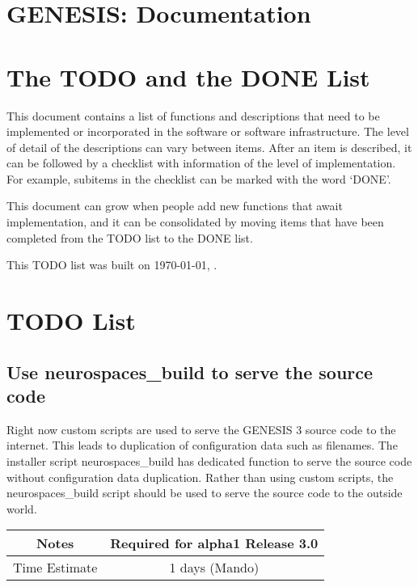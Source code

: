 \documentclass[12pt]{article}
\begin{document}
\section*{GENESIS: Documentation}

\section{The TODO and the DONE List}

This document contains a list of functions and descriptions that need
to be implemented or incorporated in the software or software
infrastructure.  The level of detail of the descriptions can vary
between items.  After an item is described, it can be followed by a
checklist with information of the level of implementation.  For
example, subitems in the checklist can be marked with the word `DONE'.

This document can grow when people add new functions that await
implementation, and it can be consolidated by moving items that have
been completed from the TODO list to the DONE list.

This TODO list was built on \today, \thistime.


\section{TODO List}

\subsection{Use neurospaces\_build to serve the source code}

Right now custom scripts are used to serve the GENESIS 3 source code
to the internet.  This leads to duplication of configuration data such
as filenames.  The installer script neurospaces\_build has dedicated
function to serve the source code without configuration data
duplication.  Rather than using custom scripts, the neurospaces\_build
script should be used to serve the source code to the outside world.

{
  \vspace{5mm}
  \centering
  \begin{tabular}{|c|c|}
    \hline
    Notes
    & Required for alpha1 Release 3.0 \\
    \hline
    Time Estimate
    & 1 days (Mando) \\
    \hline
  \end{tabular}
}
\end{document}

